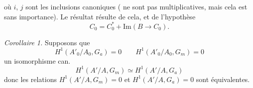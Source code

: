 \documentclass[11pt,a4paper]{article}
\begin{document}

où $i$, $j$ sont les inclusions canoniques ( ne sont
pas multiplicatives, mais cela est sans importance). Le résultat résulte
de cela, et de l'hypothèse
\[
  C_0 = C_0^{*} + \mathrm{Im}(B \to C_0) .
\]

\emph{Corollaire 1.} Supposons que
\[
  H^1(A'_0/A_0, G_a) = 0 \qquad H^1(A'_0/A_0, G_m) = 0
\]
  un 
isomorphisme can.
\[
  H^1(A'/A, G_m) \simeq H^1(A'/A, G_a)
\]
donc les relations $H^1(A'/A, G_m) = 0$ et $H^1(A'/A, G_a) = 0$ sont
équivalentes.
\end{document}
